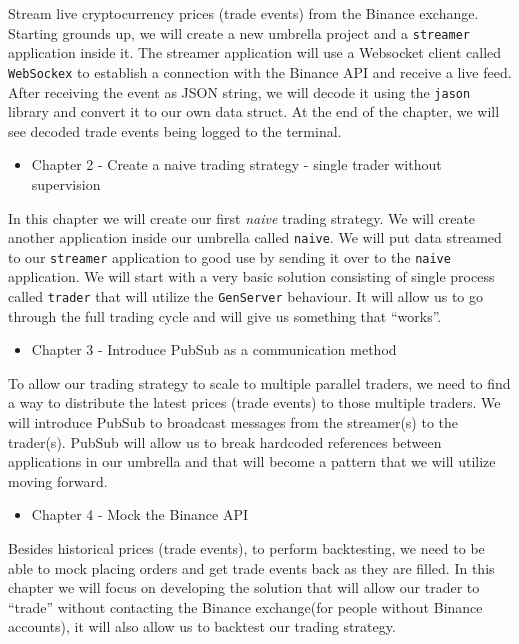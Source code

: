 \documentclass[
]{book}
\providecommand{\tightlist}{%
  \setlength{\itemsep}{0pt}\setlength{\parskip}{0pt}}
\begin{document}
Stream live cryptocurrency prices (trade events) from the Binance exchange. Starting grounds up, we will create a new umbrella project and a \texttt{streamer} application inside it. The streamer application will use a Websocket client called \texttt{WebSockex} to establish a connection with the Binance API and receive a live feed. After receiving the event as JSON string, we will decode it using the \texttt{jason} library and convert it to our own data struct. At the end of the chapter, we will see decoded trade events being logged to the terminal.

\begin{itemize}
\tightlist
\item
  Chapter 2 - Create a naive trading strategy - single trader without supervision
\end{itemize}

In this chapter we will create our first \emph{naive} trading strategy. We will create another application inside our umbrella called \texttt{naive}. We will put data streamed to our \texttt{streamer} application to good use by sending it over to the \texttt{naive} application. We will start with a very basic solution consisting of single process called \texttt{trader} that will utilize the \texttt{GenServer} behaviour. It will allow us to go through the full trading cycle and will give us something that ``works''.

\begin{itemize}
\tightlist
\item
  Chapter 3 - Introduce PubSub as a communication method
\end{itemize}

To allow our trading strategy to scale to multiple parallel traders, we need to find a way to distribute the latest prices (trade events) to those multiple traders. We will introduce PubSub to broadcast messages from the streamer(s) to the trader(s). PubSub will allow us to break hardcoded references between applications in our umbrella and that will become a pattern that we will utilize moving forward.

\begin{itemize}
\tightlist
\item
  Chapter 4 - Mock the Binance API
\end{itemize}

Besides historical prices (trade events), to perform backtesting, we need to be able to mock placing orders and get trade events back as they are filled. In this chapter we will focus on developing the solution that will allow our trader to ``trade'' without contacting the Binance exchange(for people without Binance accounts), it will also allow us to backtest our trading strategy.
\end{document}
